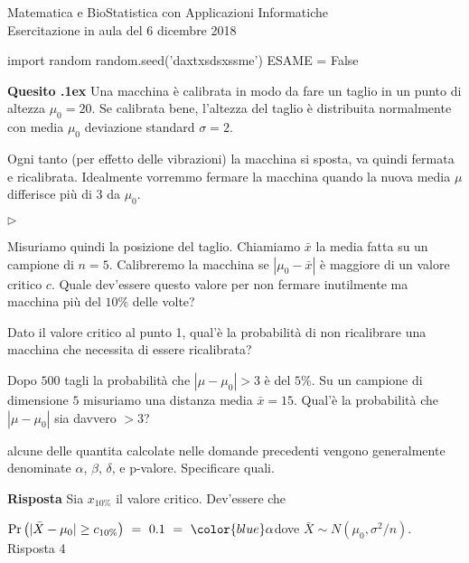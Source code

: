 \documentclass[11pt,twoside,a4paper]{article}
\newcommand{\mylabel}[1]{#1\hfill}
\renewenvironment{itemize}
  {\begin{list}{$\triangleright$}{%
   \setlength{\parskip}{0mm}
   \setlength{\topsep}{.4\baselineskip}
   \setlength{\rightmargin}{0mm}
   \setlength{\listparindent}{0mm}
   \setlength{\itemindent}{0mm}
   \setlength{\labelwidth}{2ex}
   \setlength{\itemsep}{.4\baselineskip}
   \setlength{\parsep}{0mm}
   \setlength{\partopsep}{0mm}
   \setlength{\labelsep}{1ex}
   \setlength{\leftmargin}{\labelwidth+\labelsep}
   \let\makelabel\mylabel}}{%
   \end{list}\vspace*{-1.3mm}}
\newcounter{quesito}
\newenvironment{question}{\addtocounter{quesito}{1}\par\textbf{Quesito \thequesito.\kern1ex}}{\vspace{0.5\parskip}}
\newenvironment{answer}{\par\textbf{Risposta\quad}}{\vspace{\parskip}}
\begin{document}
\colorbox{blue!10}{\begin{minipage}{\textwidth}
Matematica e BioStatistica con Applicazioni Informatiche\\
Esercitazione in aula del 6 dicembre 2018
\end{minipage}}



\begin{pycode}
import random
random.seed('daxtxsdsxssme')
ESAME = False
\end{pycode}


\bigskip\bigskip
\begin{question}
Una macchina è calibrata in modo da fare un taglio in un punto di altezza $\mu_0=20$. Se calibrata bene, l'altezza del taglio è distribuita normalmente con media $\mu_0$ deviazione standard $\sigma=2$. 

Ogni tanto (per effetto delle vibrazioni) la macchina si sposta, va quindi fermata e ricalibrata. Idealmente vorremmo fermare la macchina quando la nuova media $\mu$ differisce più di $3$ da $\mu_0$.

\begin{itemize}
\item[1.] Misuriamo quindi la posizione del taglio. Chiamiamo $\bar x$ la media fatta su un campione di $n=5$. Calibreremo la macchina se $|\mu_0-\bar x|$ è maggiore di un valore critico $c$. Quale dev'essere questo valore per non fermare inutilmente ma macchina più del $10\%$ delle volte?

\item[2.] Dato il valore critico al punto 1, qual'è la probabilità di non ricalibrare una macchina che necessita di essere ricalibrata?

\item[3.] Dopo $500$ tagli la probabilità che $|\mu-\mu_0|>3$ è del $5\%$.  Su un campione di dimensione $5$ misuriamo una distanza media $\bar x=15$. Qual'è la probabilità che  $|\mu-\mu_0|$ sia davvero $>3$?

\item[4] alcune delle quantita calcolate nelle domande precedenti vengono generalmente denominate $\alpha$, $\beta$, $\delta$, e p-valore. Specificare quali.
\end{itemize}
\begin{answer}
Sia $x_{10\%}$ il valore critico. Dev'essere che 

$\Pr\big(|\bar X-\mu_0|\ge c_{10\%}\big)\ =\ 0.1\ =\ {\color{blue}\alpha}$\hfill dove $\bar X\sim N(\mu_0, \sigma^2/n)$.\hfill{\color{blue} Risposta 4} 


\end{answer}
\end{question}
\end{document}
